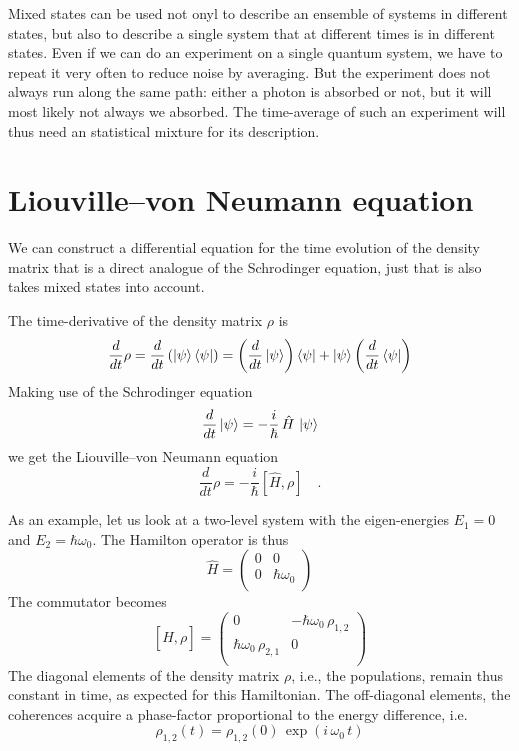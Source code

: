 Mixed states can be  used not onyl to describe an ensemble of systems in different states, but also to describe a single system that at different times is in different states. Even if we can do an experiment on  a single quantum system, we have to repeat it very often to reduce noise by averaging. But the experiment does not always run along the same path: either a photon is absorbed or not, but it will most likely not always we absorbed. The time-average of such an experiment will thus need  an statistical mixture for its description.

\section{Liouville--von Neumann equation}

We can construct a differential equation for the time evolution of the density matrix that is a direct analogue of the Schrodinger equation, just that is also takes mixed states into account.

The time-derivative of the density matrix $\rho$ is
\[
 \frac{d}{dt} \rho = \frac{d}{dt} \left( \ket{\psi} \bra{\psi} \right) 
 =  \left( \frac{d}{dt}  \ket{\psi} \right) \bra{\psi} 
 + \ket{\psi} \left( \frac{d}{dt}  \bra{\psi} \right) 
\]
Making use of the Schrodinger equation
\[
 \frac{d}{dt} \ket{\psi} = - \frac{i}{\hbar} \, \hat{H} \, \ket{\psi}
\]
we get the Liouville--von Neumann equation
\[
 \frac{d}{dt} \rho = - \frac{i}{\hbar} 
 \left[ \hat{H} , \rho \right]  \quad .
\]

As an example, let us look at a two-level system with the eigen-energies $E_1= 0$ and $E_2 = \hbar \omega_0$. The Hamilton operator is thus
\[
 \hat{H } = \begin{pmatrix}
  0 & 0 \\ 0 & \hbar \omega_0 \\
 \end{pmatrix}
\]
The commutator becomes
\[
 \left[ \hat{H}, \rho \right] = 
 \begin{pmatrix}
 0 & - \hbar \omega_0 \, \rho_{1,2} \\   \hbar \omega_0 \, \rho_{2,1} & 0 \\
 \end{pmatrix}
\]
The  diagonal elements of the density matrix $\rho$, i.e., the populations, remain thus constant in time, as expected for this Hamiltonian. The off-diagonal elements, the coherences acquire a phase-factor proportional to the energy difference, i.e.
\[
 \rho_{1,2}(t) =  \rho_{1,2}(0) \, \exp \left(i \, \omega_0 \, t \right) 
\]

